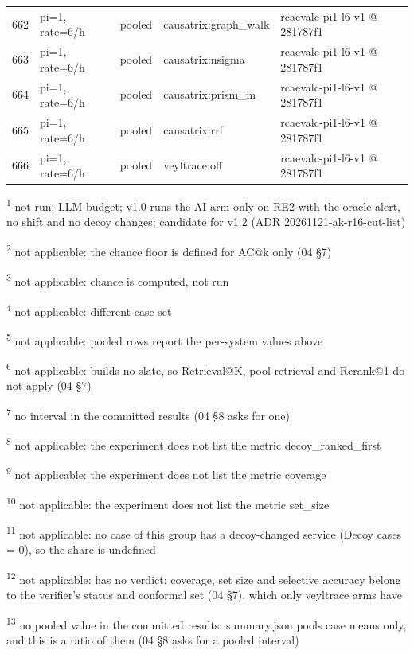 \begin{longtable}{@{}r>{\raggedright\arraybackslash}p{48.0pt}>{\raggedright\arraybackslash}p{18.0pt}>{\raggedright\arraybackslash}p{108.0pt}>{\raggedright\arraybackslash}p{105.0pt}@{}}
662 & pi=1, rate=6/h & pooled & causatrix:graph\_walk & rcaevalc-pi1-l6-v1 @ 281787f1 \\
663 & pi=1, rate=6/h & pooled & causatrix:nsigma & rcaevalc-pi1-l6-v1 @ 281787f1 \\
664 & pi=1, rate=6/h & pooled & causatrix:prism\_m & rcaevalc-pi1-l6-v1 @ 281787f1 \\
665 & pi=1, rate=6/h & pooled & causatrix:rrf & rcaevalc-pi1-l6-v1 @ 281787f1 \\
666 & pi=1, rate=6/h & pooled & veyltrace:off & rcaevalc-pi1-l6-v1 @ 281787f1 \\
\end{longtable}
\par\raggedright\noindent
\textsuperscript{1} not run: LLM budget; v1.0 runs the AI arm only on RE2 with the oracle alert, no shift and no decoy changes; candidate for v1.2 (ADR 20261121-ak-r16-cut-list)\par
\textsuperscript{2} not applicable: the chance floor is defined for AC@k only (04 \S{}7)\par
\textsuperscript{3} not applicable: chance is computed, not run\par
\textsuperscript{4} not applicable: different case set\par
\textsuperscript{5} not applicable: pooled rows report the per-system values above\par
\textsuperscript{6} not applicable: builds no slate, so Retrieval@K, pool retrieval and Rerank@1 do not apply (04 \S{}7)\par
\textsuperscript{7} no interval in the committed results (04 \S{}8 asks for one)\par
\textsuperscript{8} not applicable: the experiment does not list the metric decoy\_ranked\_first\par
\textsuperscript{9} not applicable: the experiment does not list the metric coverage\par
\textsuperscript{10} not applicable: the experiment does not list the metric set\_size\par
\textsuperscript{11} not applicable: no case of this group has a decoy-changed service (Decoy cases = 0), so the share is undefined\par
\textsuperscript{12} not applicable: has no verdict: coverage, set size and selective accuracy belong to the verifier's status and conformal set (04 \S{}7), which only veyltrace arms have\par
\textsuperscript{13} no pooled value in the committed results: summary.json pools case means only, and this is a ratio of them (04 \S{}8 asks for a pooled interval)\par
